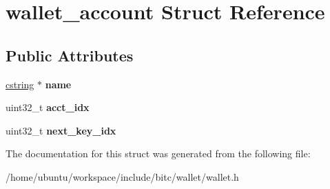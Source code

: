 \hypertarget{structwallet__account}{\section{wallet\-\_\-account Struct Reference}
\label{structwallet__account}
}
\subsection*{Public Attributes}
\begin{DoxyCompactItemize}
\item 
\hypertarget{structwallet__account_aa37912638e463c0ab8e540d915e2212b}{\hyperlink{structcstring}{cstring} $\ast$ {\bfseries name}}\label{structwallet__account_aa37912638e463c0ab8e540d915e2212b}

\item 
\hypertarget{structwallet__account_acd5a5908875e827e8d8e812b6cc9b530}{uint32\-\_\-t {\bfseries acct\-\_\-idx}}\label{structwallet__account_acd5a5908875e827e8d8e812b6cc9b530}

\item 
\hypertarget{structwallet__account_a2bf1dca4a9cbf3dafb4022b2e3eba6ac}{uint32\-\_\-t {\bfseries next\-\_\-key\-\_\-idx}}\label{structwallet__account_a2bf1dca4a9cbf3dafb4022b2e3eba6ac}

\end{DoxyCompactItemize}


The documentation for this struct was generated from the following file\-:\begin{DoxyCompactItemize}
\item 
/home/ubuntu/workspace/include/bitc/wallet/wallet.\-h\end{DoxyCompactItemize}
